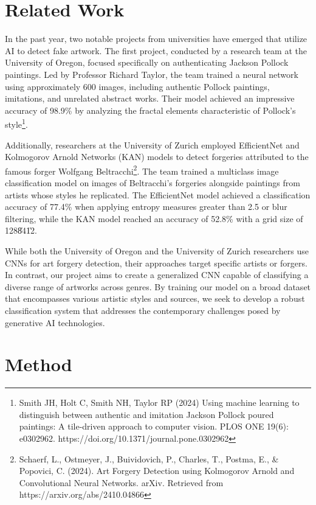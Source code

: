 \section{Related Work}
\par In the past year, two notable projects from universities have emerged that utilize AI to detect fake artwork. The first project, conducted by a research team at the University of Oregon, focused specifically on authenticating Jackson Pollock paintings. Led by Professor Richard Taylor, the team trained a neural network using approximately 600 images, including authentic Pollock paintings, imitations, and unrelated abstract works. Their model achieved an impressive accuracy of 98.9\% by analyzing the fractal elements characteristic of Pollock's style\footnote{Smith JH, Holt C, Smith NH, Taylor RP (2024) Using machine learning to distinguish between authentic and imitation Jackson Pollock poured paintings: A tile-driven approach to computer vision. PLOS ONE 19(6): e0302962. https://doi.org/10.1371/journal.pone.0302962}.
\\
\par Additionally, researchers at the University of Zurich employed EfficientNet and Kolmogorov Arnold Networks (KAN) models to detect forgeries attributed to the famous forger Wolfgang Beltracchi\footnote{Schaerf, L., Ostmeyer, J., Buividovich, P., Charles, T., Postma, E., & Popovici, C. (2024). Art Forgery Detection using Kolmogorov Arnold and Convolutional Neural Networks. arXiv. Retrieved from https://arxiv.org/abs/2410.04866}. The team trained a multiclass image classification model on images of Beltracchi's forgeries alongside paintings from artists whose styles he replicated. The EfficientNet model achieved a classification accuracy of 77.4\% when applying entropy measures greater than 2.5 or blur filtering, while the KAN model reached an accuracy of 52.8\% with a grid size of 128\|84\|12.
\\
\par While both the University of Oregon and the University of Zurich researchers use CNNs for art forgery detection, their approaches target specific artists or forgers. In contrast, our project aims to create a generalized CNN capable of classifying a diverse range of artworks across genres. By training our model on a broad dataset that encompasses various artistic styles and sources, we seek to develop a robust classification system that addresses the contemporary challenges posed by generative AI technologies.

\section{Method}

